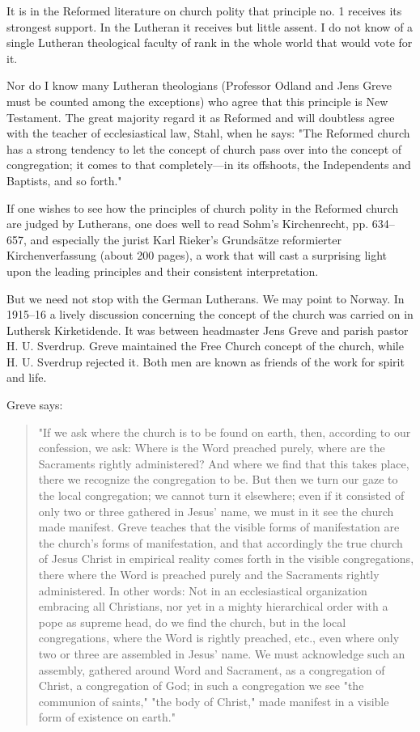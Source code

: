 It is in the Reformed literature on church polity that principle no. 1 receives its strongest support. In the Lutheran it receives but little assent. I do not know of a single Lutheran theological faculty of rank in the whole world that would vote for it.

Nor do I know many Lutheran theologians (Professor Odland and Jens Greve must be counted among the exceptions) who agree that this principle is New Testament. The great majority regard it as Reformed and will doubtless agree with the teacher of ecclesiastical law, Stahl, when he says: "The Reformed church has a strong tendency to let the concept of church pass over into the concept of congregation; it comes to that completely—in its offshoots, the Independents and Baptists, and so forth."

If one wishes to see how the principles of church polity in the Reformed church are judged by Lutherans, one does well to read Sohm’s Kirchenrecht, pp. 634–657, and especially the jurist Karl Rieker’s Grundsätze reformierter Kirchenverfassung (about 200 pages), a work that will cast a surprising light upon the leading principles and their consistent interpretation.

But we need not stop with the German Lutherans. We may point to Norway. In 1915–16 a lively discussion concerning the concept of the church was carried on in Luthersk Kirketidende. It was between headmaster Jens Greve and parish pastor H. U. Sverdrup. Greve maintained the Free Church concept of the church, while H. U. Sverdrup rejected it. Both men are known as friends of the work for spirit and life.

Greve says:
\begin{quote}
"If we ask where the church is to be found on earth, then, according to our confession, we ask: Where is the Word preached purely, where are the Sacraments rightly administered? And where we find that this takes place, there we recognize the congregation to be. But then we turn our gaze to the local congregation; we cannot turn it elsewhere; even if it consisted of only two or three gathered in Jesus’ name, we must in it see the church made manifest. Greve teaches that the visible forms of manifestation are the church’s forms of manifestation, and that accordingly the true church of Jesus Christ in empirical reality comes forth in the visible congregations, there where the Word is preached purely and the Sacraments rightly administered. In other words: Not in an ecclesiastical organization embracing all Christians, nor yet in a mighty hierarchical order with a pope as supreme head, do we find the church, but in the local congregations, where the Word is rightly preached, etc., even where only two or three are assembled in Jesus’ name. We must acknowledge such an assembly, gathered around Word and Sacrament, as a congregation of Christ, a congregation of God; in such a congregation we see "the communion of saints," "the body of Christ," made manifest in a visible form of existence on earth."
\end{quote}

